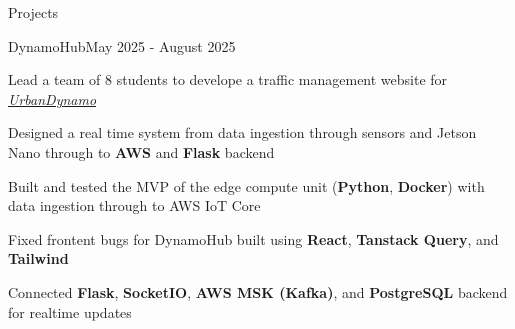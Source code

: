 \documentclass[
	11pt, %
]{resume} %
\begin{document}
\begin{rSection}{Projects}



	\begin{rSubsection}{DynamoHub}{May 2025 - August 2025}{}{}
		\item Lead a team of 8 students to develope a traffic management website for \textit{\href{https://linkedin.com/in/mnkhoi}{UrbanDynamo}}
		\item Designed a real time system from data ingestion through sensors and Jetson Nano through to \textbf{AWS} and \textbf{Flask} backend
		\item Built and tested the MVP of the edge compute unit (\textbf{Python}, \textbf{Docker}) with data ingestion through to AWS IoT Core
		\item Fixed frontent bugs for DynamoHub built using \textbf{React}, \textbf{Tanstack Query}, and \textbf{Tailwind}
		\item Connected \textbf{Flask}, \textbf{SocketIO}, \textbf{AWS MSK (Kafka)}, and \textbf{PostgreSQL} backend for realtime updates
	\end{rSubsection}

\end{rSection}

%
%
\end{document}

